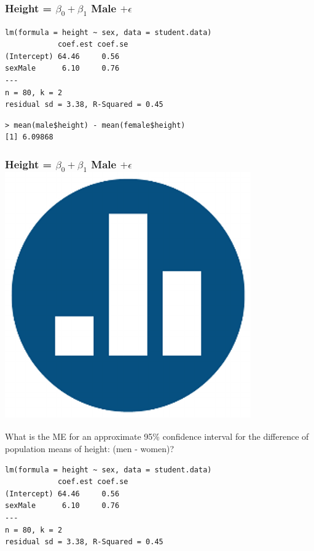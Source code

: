 \documentclass[handout]{beamer}
\begin{document}
\begin{frame}[fragile]
\frametitle{Height = $\beta_0 + \beta_1$ Male $+ \epsilon$}

\footnotesize
\begin{verbatim}
lm(formula = height ~ sex, data = student.data)
            coef.est coef.se
(Intercept) 64.46     0.56  
sexMale      6.10     0.76  
---
n = 80, k = 2
residual sd = 3.38, R-Squared = 0.45
\end{verbatim}
\pause
\begin{verbatim}
> mean(male$height) - mean(female$height)
[1] 6.09868
\end{verbatim}
\end{frame}




\begin{frame}[fragile]
\frametitle{Height = $\beta_0 + \beta_1$ Male $+ \epsilon$ \hfill \includegraphics[scale = 0.05]{./images/clicker}}

\alert{What is the ME for an approximate 95\% confidence interval for the difference of population means of height: (men - women)?}

\footnotesize
\begin{verbatim}
lm(formula = height ~ sex, data = student.data)
            coef.est coef.se
(Intercept) 64.46     0.56  
sexMale      6.10     0.76  
---
n = 80, k = 2
residual sd = 3.38, R-Squared = 0.45
\end{verbatim}

\end{frame}
\end{document}
